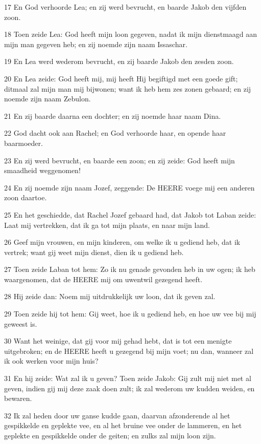 \par 17 En God verhoorde Lea; en zij werd bevrucht, en baarde Jakob den vijfden zoon.
\par 18 Toen zeide Lea: God heeft mijn loon gegeven, nadat ik mijn dienstmaagd aan mijn man gegeven heb; en zij noemde zijn naam Issaschar.
\par 19 En Lea werd wederom bevrucht, en zij baarde Jakob den zesden zoon.
\par 20 En Lea zeide: God heeft mij, mij heeft Hij begiftigd met een goede gift; ditmaal zal mijn man mij bijwonen; want ik heb hem zes zonen gebaard; en zij noemde zijn naam Zebulon.
\par 21 En zij baarde daarna een dochter; en zij noemde haar naam Dina.
\par 22 God dacht ook aan Rachel; en God verhoorde haar, en opende haar baarmoeder.
\par 23 En zij werd bevrucht, en baarde een zoon; en zij zeide: God heeft mijn smaadheid weggenomen!
\par 24 En zij noemde zijn naam Jozef, zeggende: De HEERE voege mij een anderen zoon daartoe.
\par 25 En het geschiedde, dat Rachel Jozef gebaard had, dat Jakob tot Laban zeide: Laat mij vertrekken, dat ik ga tot mijn plaats, en naar mijn land.
\par 26 Geef mijn vrouwen, en mijn kinderen, om welke ik u gediend heb, dat ik vertrek; want gij weet mijn dienst, dien ik u gediend heb.
\par 27 Toen zeide Laban tot hem: Zo ik nu genade gevonden heb in uw ogen; ik heb waargenomen, dat de HEERE mij om uwentwil gezegend heeft.
\par 28 Hij zeide dan: Noem mij uitdrukkelijk uw loon, dat ik geven zal.
\par 29 Toen zeide hij tot hem: Gij weet, hoe ik u gediend heb, en hoe uw vee bij mij geweest is.
\par 30 Want het weinige, dat gij voor mij gehad hebt, dat is tot een menigte uitgebroken; en de HEERE heeft u gezegend bij mijn voet; nu dan, wanneer zal ik ook werken voor mijn huis?
\par 31 En hij zeide: Wat zal ik u geven? Toen zeide Jakob: Gij zult mij niet met al geven, indien gij mij deze zaak doen zult; ik zal wederom uw kudden weiden, en bewaren.
\par 32 Ik zal heden door uw ganse kudde gaan, daarvan afzonderende al het gespikkelde en geplekte vee, en al het bruine vee onder de lammeren, en het geplekte en gespikkelde onder de geiten; en zulks zal mijn loon zijn.
